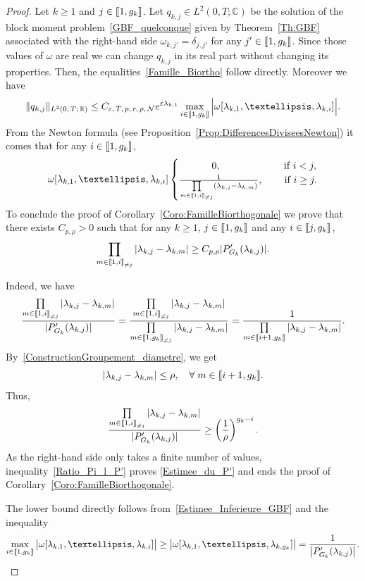 \documentclass[11pt]{article}
\theoremstyle{definition}
\numberwithin{equation}{section}
\numberwithin{figure}{section}
\numberwithin{table}{section}
\newcommand{\llbracket}{\mathopen{[\mkern -2.7mu[}}
\newcommand{\rrbracket}{\mathclose{]\mkern -2.7mu]}}
\newcommand{\inter}[2]{\llbracket #1,#2 \rrbracket}
\newcommand{\interexclu}[3]{\llbracket #1,#2\rrbracket_{\neq #3}}
\newcommand{\n}{g}
\newcommand{\NN}{\mathcal{N}}
\newcommand{\R}{\mathbb{R}}
\newcommand{\C}{\mathbb{C}}
\let\oldforall\forall
\renewcommand*{\forall}{\mathrel{\oldforall}}
\begin{document}
\begin{proof}
Let $k \geq 1$ and $j \in \inter{1}{\n_k}$. Let $q_{k,j} \in L^2(0,T ; \C)$ be the solution of the block moment problem~\eqref{GBF_quelconque} given by Theorem~\ref{Th:GBF} associated with the right-hand side $\omega_{k, j'} = \delta_{j,j'}$ for any $j' \in \inter{1}{\n_k}$. Since those values of $\omega$ are real we can change $q_{k,j}$ in its real part without changing its properties. Then, the equalities~\eqref{Famille_Biortho} follow directly. Moreover we have
\[
\| q_{k,j} \|_{L^2(0,\,T ;\,\R)} \leq C_{\varepsilon,\,T,\,p,\,r,\,\rho,\,\NN} e^{\varepsilon \lambda_{k,1}} \max \limits_{i\in \inter{1}{\n_k}} \Big| \omega[\lambda_{k,1}, \dots, \lambda_{k,i}] \Big|.
\]
From the Newton formula (see Proposition~\ref{Prop:DifferencesDiviseesNewton}) it comes that for any $i \in \inter{1}{\n_k}$,
\begin{equation*}
\omega[\lambda_{k,1}, \dots, \lambda_{k,i}] \begin{cases}
\mkern60mu 0,& \quad\;\text{if }i<j,\\
\frac{1}{\prod\limits_{m \in \interexclu{1}{i}{j}} (\lambda_{k,j}-\lambda_{k,m})},&\quad \text{ if }i\geq j.
\end{cases}
\end{equation*}
To conclude the proof of Corollary~\ref{Coro:FamilleBiorthogonale} we prove that there exists $C_{p, \rho}>0$ such that for any $k\geq 1$, $j \in \inter{1}{\n_k}$ and any $i \in \inter{j}{\n_k}$,
\begin{equation}\label{Estimee_du_P'}
\prod_{m \in \interexclu{1}{i}{j}} | \lambda_{k,j} - \lambda_{k,m}| \geq C_{p,\rho} |P_{G_k}' (\lambda_{k,j}) |.
\end{equation}

Indeed, we have
\begin{equation*}
\frac{ \prod\limits_{m\in \interexclu{1}{i}{j} } | \lambda_{k,j} - \lambda_{k,m}|}{|P_{G_k}' (\lambda_{k,j}) |} = \frac{\prod\limits_{m\in \interexclu{1}{i}{j}} | \lambda_{k,j} - \lambda_{k,m}|}{\prod\limits_{m\in \interexclu{1}{\n_k}{j}} | \lambda_{k,j} - \lambda_{k,m}|} = \frac{1}{\prod\limits_{m\in \inter{i+1}{\n_k}} | \lambda_{k,j} - \lambda_{k,m}|}.
\end{equation*}
By~\eqref{ConstructionGroupement_diametre}, we get
\[
|\lambda_{k,j}-\lambda_{k,m}| \leq \rho, \quad \forall m \in \inter{i+1}{\n_k}.
\]
Thus,
\begin{equation}\label{Ratio_Pi_l_P'}
\frac{\prod\limits_{m\in \interexclu{1}{i}{j} } | \lambda_{k,j} - \lambda_{k,m}|}{|P_{G_k}' (\lambda_{k,j}) |}
\geq \left(\frac{1}{\rho} \right)^{\n_k-i}.
\end{equation}
As the right-hand side only takes a finite number of values, inequality~\eqref{Ratio_Pi_l_P'} proves \eqref{Estimee_du_P'} and ends the proof of Corollary~\ref{Coro:FamilleBiorthogonale}.

The lower bound directly follows from~\eqref{Estimee_Inferieure_GBF} and the inequality
\[
\max \limits_{i\in \inter{1}{\n_k}} \big| \omega[\lambda_{k,1}, \dots, \lambda_{k,i}] \big| \geq \big| \omega[\lambda_{k,1}, \dots, \lambda_{k,\n_k}] \big| = \frac{1}{\left| P_{G_k}'(\lambda_{k,j}) \right| }.\qedhere
\]
\end{proof}
\end{document}
